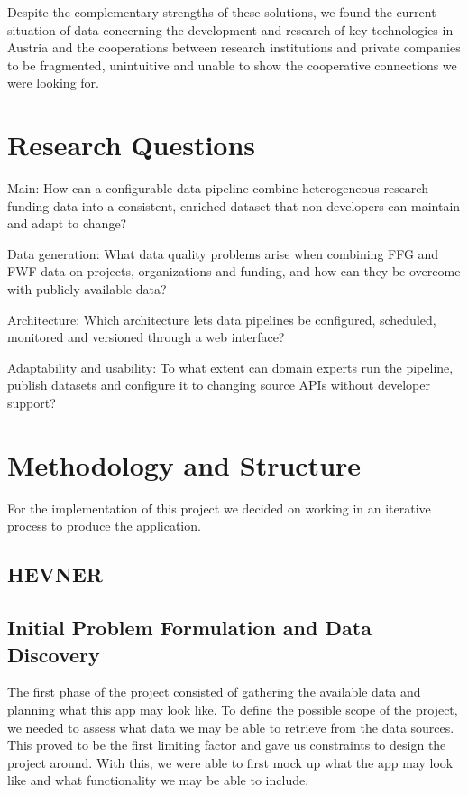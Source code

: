 Despite the complementary strengths of these solutions, we found the current situation of data concerning the development and research of key technologies in Austria and the cooperations between research institutions and private companies to be fragmented, unintuitive and unable to show the cooperative connections we were looking for.

\section{Research Questions}


Main: How can a configurable data pipeline combine heterogeneous research-funding data into a consistent, enriched
dataset that non-developers can maintain and adapt to change?

Data generation: What data quality problems arise when combining FFG and FWF data on projects, organizations and
funding, and how can they be overcome with publicly available data?

Architecture: Which architecture lets data pipelines be configured, scheduled, monitored and versioned through a web
interface?

Adaptability and usability: To what extent can domain experts run the pipeline, publish datasets and configure it to
changing source APIs without developer support?

\section{Methodology and Structure}

For the implementation of this project we decided on working in an iterative process to produce the application.

\subsection{HEVNER}


\subsection{Initial Problem Formulation and Data Discovery}



The first phase of the project consisted of gathering the available data and planning what this app may look like. To
define the possible scope of the project, we needed to assess what data we may be able to retrieve from the data
sources. This proved to be the first limiting factor and gave us constraints to design the project around. With this, we
were able to first mock up what the app may look like and what functionality we may be able to include.

